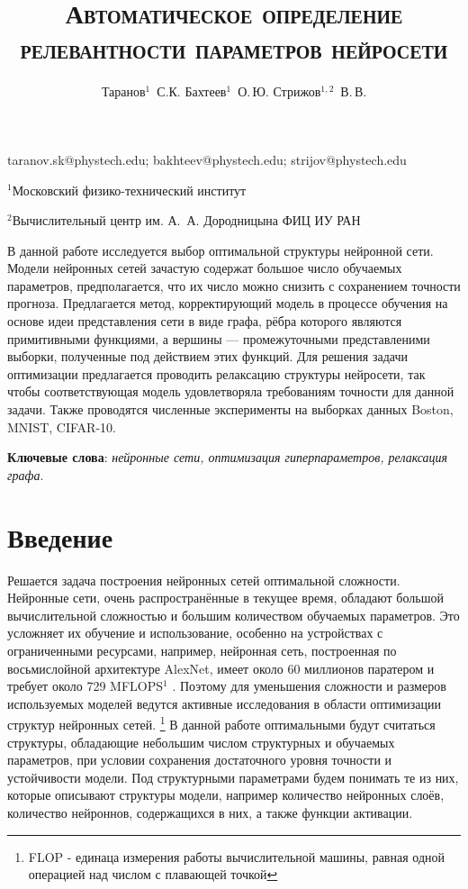 \documentclass[12pt, twoside]{article}
\begin{document}
\title{\textsc{Автоматическое определение релевантности параметров нейросети}}

\author
    {Таранов$^1$~С.К. Бахтеев$^1$~О.\,Ю.  Стрижов$^{1,2}$~В.\,В.} 

\email
    {taranov.sk@phystech.edu; bakhteev@phystech.edu; strijov@phystech.edu}
    
\organization
    {$^1$Московский физико-технический институт\par
    $^2$Вычислительный центр им. А.~А. Дородницына ФИЦ ИУ РАН}

\abstract
	{В данной работе исследуется выбор оптимальной структуры нейронной сети.  Модели нейронных сетей зачастую содержат большое число обучаемых параметров, предполагается, что их число можно снизить с сохранением точности прогноза. Предлагается метод, корректирующий модель в процессе обучения на основе идеи представления сети в виде графа, рёбра которого являются примитивными функциями, а вершины --- промежуточными представленими выборки, полученные под действием этих функций. Для решения задачи оптимизации предлагается проводить релаксацию структуры нейросети, так чтобы соответствующая модель удовлетворяла требованиям точности для данной задачи. Также проводятся численные эксперименты на выборках данных Boston, MNIST, CIFAR-10.

\bigskip
\textbf{Ключевые слова}: \emph {нейронные сети, оптимизация гиперпараметров, релаксация графа}.

}

\maketitle

\section{Введение}
Решается задача построения нейронных сетей оптимальной сложности. Нейронные сети, очень распространённые в текущее время, обладают большой вычислительной сложностью и большим количеством обучаемых параметров. Это усложняет их обучение и использование, особенно на устройствах с ограниченными ресурсами, например, нейронная сеть, построенная по восьмислойной архитектуре AlexNet, имеет около 60 миллионов паратером и требует около 729 MFLOPS$^1$ \cite{Alex_power}. Поэтому для уменьшения сложности и размеров используемых моделей ведутся активные исследования в области оптимизации структур нейронных сетей. 
\footnote[1]{FLOP - единаца измерения работы вычислительной машины, равная одной операцией над числом с плавающей точкой}
В данной работе оптимальными будут считаться структуры, обладающие небольшим числом структурных и обучаемых параметров, при условии сохранения достаточного уровня точности и устойчивости модели. Под структурными параметрами будем понимать те из них, которые описывают структуры модели, например количество нейронных слоёв, количество нейроннов, содержащихся в них, а также функции активации. 
\end{document}
